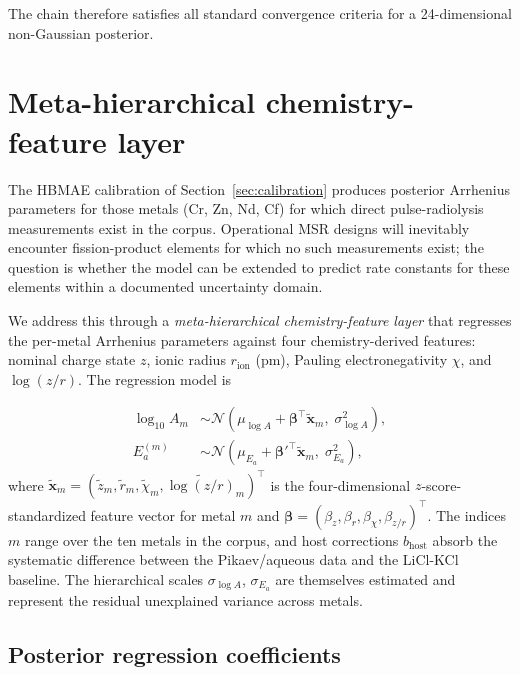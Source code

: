 \documentclass[11pt]{article}
\theoremstyle{plain}
\theoremstyle{definition}
\theoremstyle{remark}
\newcommand{\Ea}{E_a}
\begin{document}
The chain therefore satisfies all standard convergence criteria for a
24-dimensional non-Gaussian posterior.

\section{Meta-hierarchical chemistry-feature layer}\label{sec:metahier}

The HBMAE calibration of Section~\ref{sec:calibration} produces posterior
Arrhenius parameters for those metals (Cr, Zn, Nd, Cf) for which direct
pulse-radiolysis measurements exist in the corpus.  Operational MSR designs
will inevitably encounter fission-product elements for which no such
measurements exist; the question is whether the model can be extended to
predict rate constants for these elements within a documented uncertainty
domain.

We address this through a \emph{meta-hierarchical chemistry-feature layer}
that regresses the per-metal Arrhenius parameters against four
chemistry-derived features: nominal charge state $z$, ionic radius
$r_{\mathrm{ion}}$ (pm), Pauling electronegativity $\chi$, and $\log(z/r)$.
The regression model is

\begin{align}
\log_{10}\!A_m &\sim \mathcal{N}\!\left(\mu_{\log A}
       + \boldsymbol{\beta}^\top \tilde{\boldsymbol{x}}_m,
       \;\sigma_{\log A}^2\right),\label{eq:meta-logA}\\
\Ea^{(m)} &\sim \mathcal{N}\!\left(\mu_{\Ea}
       + \boldsymbol{\beta}'^\top \tilde{\boldsymbol{x}}_m,
       \;\sigma_{\Ea}^2\right),\label{eq:meta-Ea}
\end{align}
where $\tilde{\boldsymbol{x}}_m = (\tilde{z}_m, \tilde{r}_m, \tilde{\chi}_m,
\widetilde{\log(z/r)}_m)^\top$ is the four-dimensional $z$-score-standardized
feature vector for metal $m$ and $\boldsymbol{\beta} = (\beta_z, \beta_r,
\beta_\chi, \beta_{z/r})^\top$.  The indices $m$ range over the ten metals in
the corpus, and host corrections $b_{\mathrm{host}}$ absorb the systematic
difference between the Pikaev/aqueous data and the LiCl-KCl baseline.  The
hierarchical scales $\sigma_{\log A}$, $\sigma_{\Ea}$ are themselves
estimated and represent the residual unexplained variance across metals.

\subsection{Posterior regression coefficients}
\end{document}
